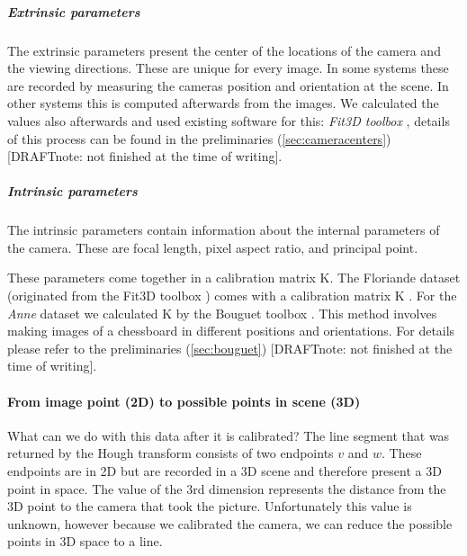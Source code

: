 	\subparagraph{Extrinsic parameters}
	The extrinsic parameters present the center of the locations of the camera
	and the viewing directions. These are unique for every image.
	In some systems these are recorded by measuring the cameras position and
	orientation at the scene. In other systems this is computed afterwards from the images.  
	We calculated the values also afterwards and used existing software for
	this: \emph{Fit3D toolbox} \cite{Fit3d}, details of this process can be
	found in the preliminaries (\ref{sec:cameracenters}) [DRAFTnote: not
	finished at the time of writing].\\  

	\subparagraph{Intrinsic parameters}
	The intrinsic parameters contain information about the internal parameters
	of the camera.  These are focal length, pixel aspect ratio, and principal point.

	These parameters come together in a calibration matrix K.  The Floriande
	dataset (originated from the Fit3D toolbox \cite{Fit3d}) comes with a
	calibration matrix K .  For
	the \emph{Anne} dataset we calculated K by the Bouguet toolbox
	\cite{bouguet}.
	This method involves making images of a chessboard in
	different positions and orientations. For details please refer to the
	preliminaries (\ref{sec:bouguet}) [DRAFTnote: not finished at the
	time of writing].

	 
	\paragraph{From image point (2D) to possible points in scene (3D)} 
	What can we do with this data after it is calibrated?
	The line segment that was returned by the Hough transform consists of two
	endpoints $v$ and $w$. These endpoints are in 2D but are recorded in a 3D
	scene and therefore present a 3D point in space.  The value of the 3rd
	dimension represents the distance from the 3D point to the camera that took
	the picture. Unfortunately this value is unknown, however because we
	calibrated the camera, we can reduce the possible points in 3D space to a
	line.\\

